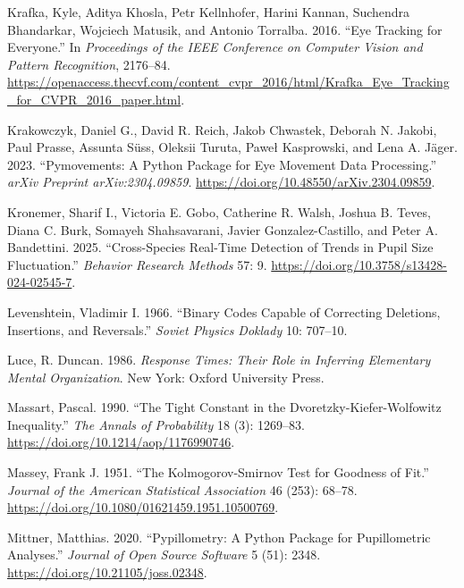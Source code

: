 \documentclass[
]{article}
\newlength{\cslhangindent}
\newenvironment{CSLReferences}[2] %
 {\begin{list}{}{%
  \setlength{\itemindent}{0pt}
  \setlength{\leftmargin}{0pt}
  \setlength{\parsep}{0pt}
  \ifodd #1
   \setlength{\leftmargin}{\cslhangindent}
   \setlength{\itemindent}{-1\cslhangindent}
  \fi
  \setlength{\itemsep}{#2\baselineskip}}}
 {\end{list}}
\begin{document}
\begin{CSLReferences}{1}{0}
Krafka, Kyle, Aditya Khosla, Petr Kellnhofer, Harini Kannan, Suchendra
Bhandarkar, Wojciech Matusik, and Antonio Torralba. 2016. {``Eye
Tracking for Everyone.''} In \emph{Proceedings of the IEEE Conference on
Computer Vision and Pattern Recognition}, 2176--84.
\url{https://openaccess.thecvf.com/content_cvpr_2016/html/Krafka_Eye_Tracking_for_CVPR_2016_paper.html}.

Krakowczyk, Daniel G., David R. Reich, Jakob Chwastek, Deborah N.
Jakobi, Paul Prasse, Assunta Süss, Oleksii Turuta, Paweł Kasprowski, and
Lena A. Jäger. 2023. {``Pymovements: A Python Package for Eye Movement
Data Processing.''} \emph{arXiv Preprint arXiv:2304.09859}.
\url{https://doi.org/10.48550/arXiv.2304.09859}.

Kronemer, Sharif I., Victoria E. Gobo, Catherine R. Walsh, Joshua B.
Teves, Diana C. Burk, Somayeh Shahsavarani, Javier Gonzalez-Castillo,
and Peter A. Bandettini. 2025. {``Cross-Species Real-Time Detection of
Trends in Pupil Size Fluctuation.''} \emph{Behavior Research Methods}
57: 9. \url{https://doi.org/10.3758/s13428-024-02545-7}.

Levenshtein, Vladimir I. 1966. {``Binary Codes Capable of Correcting
Deletions, Insertions, and Reversals.''} \emph{Soviet Physics Doklady}
10: 707--10.

Luce, R. Duncan. 1986. \emph{Response Times: Their Role in Inferring
Elementary Mental Organization}. New York: Oxford University Press.

Massart, Pascal. 1990. {``The Tight Constant in the
Dvoretzky-Kiefer-Wolfowitz Inequality.''} \emph{The Annals of
Probability} 18 (3): 1269--83.
\url{https://doi.org/10.1214/aop/1176990746}.

Massey, Frank J. 1951. {``The Kolmogorov-Smirnov Test for Goodness of
Fit.''} \emph{Journal of the American Statistical Association} 46 (253):
68--78. \url{https://doi.org/10.1080/01621459.1951.10500769}.

Mittner, Matthias. 2020. {``Pypillometry: A Python Package for
Pupillometric Analyses.''} \emph{Journal of Open Source Software} 5
(51): 2348. \url{https://doi.org/10.21105/joss.02348}.


\end{CSLReferences}
\end{document}
